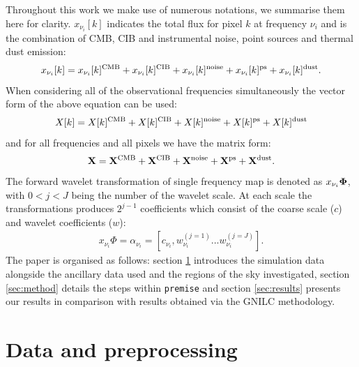 \documentclass[a4paper,fleqn,usenatbib]{mnras}
\begin{document}
Throughout this work we make use of numerous notations, we summarise them here for clarity. $x_{\nu_{i}}[k]$ indicates the total flux for pixel $k$ at frequency $\nu_{i}$ and is the combination of CMB, CIB and instrumental noise, point sources and thermal dust emission:
\begin{equation}
x_{\nu_{i}}[k] = x_{\nu_{i}}[k] ^{\rm{CMB}} + x_{\nu_{i}}[k] ^{\rm{CIB}} + x_{\nu_{i}}[k] ^{\rm{noise}} + x_{\nu_{i}}[k] ^{\rm{ps}} + x_{\nu_{i}}[k] ^{\rm{dust}}.
\end{equation}  
When considering all of the observational frequencies simultaneously the vector form of the above equation can be used:
\begin{equation}
X[k] = X[k] ^{\rm{CMB}} + X[k] ^{\rm{CIB}} + X[k] ^{\rm{noise}}  + X[k] ^{\rm{ps}} + X[k] ^{\rm{dust}}
\end{equation}  
and for all frequencies and all pixels we have the matrix form:
\begin{eqnarray}
{\bf{X}} = {\bf{X}} ^{\rm{CMB}} + {\bf{X}} ^{\rm{CIB}} + {\bf{X}} ^{\rm{noise}} + {\bf{X}} ^{\rm{ps}} + {\bf{X}}^{\rm{dust}}.
\end{eqnarray} 
The forward wavelet transformation of single frequency map is denoted as  $x_{\nu_{i}} {\bf{\Phi}}$, with $0 < j < J$ being the number of the wavelet scale. At each scale the transformations produces $2^{j-1}$ coefficients which consist of the coarse scale ($c$) and wavelet coefficients ($w$):
\begin{eqnarray}
x_{\nu_{i}} \Phi  = \alpha_{\nu_{i}} = [c_{\nu_{i}}, w_{\nu_{i}}^{(j=1)} ... w_{\nu_{i}}^{(j=J)}].
\end{eqnarray} 
The paper is organised as follows: section \ref{sec:data} introduces the simulation data alongside the ancillary data used and the regions of the sky investigated, section \ref{sec:method} details the steps within {\texttt{premise}} and section \ref{sec:results} presents our results in comparison with results obtained via the GNILC methodology.  

\section{Data and preprocessing}
\label{sec:data}
\end{document}
